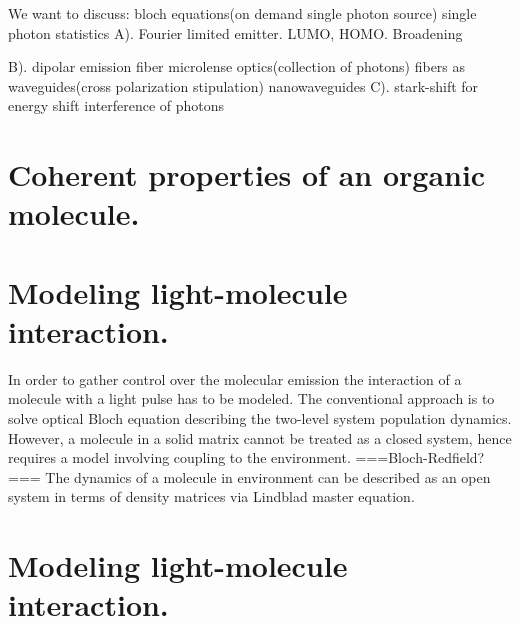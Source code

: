 We want to discuss:
    bloch equations(on demand single photon source)
    single photon statistics
A). Fourier limited emitter. LUMO, HOMO. 
    Broadening   
    
B). 
    dipolar emission
    fiber microlense optics(collection of photons)
    fibers as waveguides(cross polarization stipulation)
    nanowaveguides
C).
    stark-shift for energy shift
    interference of photons
    
\section{Coherent properties of an organic molecule.}



\section{Modeling light-molecule interaction.}
In order to gather control over the molecular emission the interaction of a molecule with a light pulse has to be modeled. The conventional approach is to solve optical Bloch equation describing the two-level system population dynamics. However, a molecule in a solid matrix cannot be treated as a closed system, hence requires a model involving coupling to the environment. ===Bloch-Redfield?=== The dynamics of a molecule in environment can be described as an open system in terms of density matrices via Lindblad master equation\cite{Manzano}.  

\section{Modeling light-molecule interaction.}